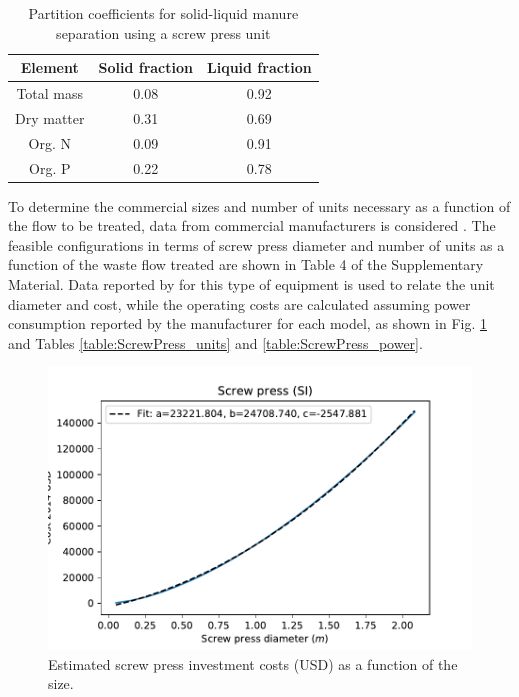 \begin{refsection}[referencesApD]
\begin{table}[h!] 
	\begin{adjustwidth}{}{}
		\centering
		\caption{Partition coefficients for solid-liquid manure separation using a screw press unit \protect\citep{MollerSLsep}} \label{table:part_coef}
		\begin{tabular}{c c c}
			\toprule
			Element 	& Solid fraction & Liquid fraction	\\ \midrule
			Total mass 	& 0.08		& 0.92 \\
			Dry matter 	& 0.31		& 0.69 \\
			Org. N 		& 0.09		& 0.91 \\
			Org. P		& 0.22	 	& 0.78 \\ \bottomrule
		\end{tabular}
	\end{adjustwidth}
\end{table}

To determine the commercial sizes and number of units necessary as a function of the flow to be treated, data from commercial manufacturers is considered \citep{PWTech}. The feasible configurations in terms of screw press diameter and number of units as a function of the waste flow treated are shown in Table 4 of the Supplementary Material. Data reported by \citet{Matches} for this type of equipment is used to relate the unit diameter and cost, while the operating costs are calculated assuming power consumption reported by the manufacturer for each model, as shown in Fig. \ref{fig:screwpress_investment_costs} and Tables \ref{table:ScrewPress_units} and \ref{table:ScrewPress_power}.

\begin{figure}[h!]
	\centering
	\includegraphics[width=0.6\linewidth, trim={0.5cm 0cm 0cm 0cm},clip]{gfx/AppendixD/screwpress_cost_m} 
	\caption{Estimated screw press investment costs (USD) as a function of the size.}
	\label{fig:screwpress_investment_costs}
\end{figure}


\end{refsection}
